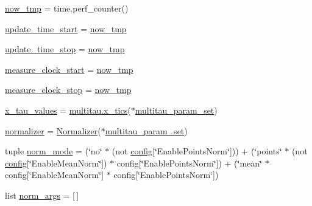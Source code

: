 \begin{DoxyCompactItemize}
\item 
\hyperlink{namespacephoton__statistics_a421423fcce411e182e41fde2e450d2d9}{now\+\_\+tmp} = time.\+perf\+\_\+counter()
\item 
\hyperlink{namespacephoton__statistics_a2c4e09ca6009ec89417e7fb1842dc290}{update\+\_\+time\+\_\+start} = \hyperlink{namespacephoton__statistics_a421423fcce411e182e41fde2e450d2d9}{now\+\_\+tmp}
\item 
\hyperlink{namespacephoton__statistics_a1353da1c17a4f960cbacf200dcf13d4f}{update\+\_\+time\+\_\+stop} = \hyperlink{namespacephoton__statistics_a421423fcce411e182e41fde2e450d2d9}{now\+\_\+tmp}
\item 
\hyperlink{namespacephoton__statistics_a5c7400e3258e9336ce831f0fbda24f33}{measure\+\_\+clock\+\_\+start} = \hyperlink{namespacephoton__statistics_a421423fcce411e182e41fde2e450d2d9}{now\+\_\+tmp}
\item 
\hyperlink{namespacephoton__statistics_a328243354a643086bd68145d804782d0}{measure\+\_\+clock\+\_\+stop} = \hyperlink{namespacephoton__statistics_a421423fcce411e182e41fde2e450d2d9}{now\+\_\+tmp}
\item 
\hyperlink{namespacephoton__statistics_a930bc99eb656180a9ae6318b16d77976}{x\+\_\+tau\+\_\+values} = \hyperlink{namespacemultitau_a775aea685fe55a6707400660fadf9c35}{multitau.\+x\+\_\+tics}($\ast$\hyperlink{namespacephoton__statistics_a3c57d728c4b1cdcb2b6ca63bc6adfc4d}{multitau\+\_\+param\+\_\+set})
\item 
\hyperlink{namespacephoton__statistics_a4476861cf199e5ef481ee4bc15e08847}{normalizer} = \hyperlink{classnormalizer_1_1Normalizer}{Normalizer}($\ast$\hyperlink{namespacephoton__statistics_a3c57d728c4b1cdcb2b6ca63bc6adfc4d}{multitau\+\_\+param\+\_\+set})
\item 
tuple \hyperlink{namespacephoton__statistics_a28a89caae4538b504046ed301158e677}{norm\+\_\+mode} = (\char`\"{}no\char`\"{} $\ast$ (not \hyperlink{namespacephoton__statistics_a4176c548148b1c86da6ddf320ab00e90}{config}\mbox{[}\char`\"{}Enable\+Points\+Norm\char`\"{}\mbox{]})) + (\char`\"{}points\char`\"{} $\ast$ (not \hyperlink{namespacephoton__statistics_a4176c548148b1c86da6ddf320ab00e90}{config}\mbox{[}\char`\"{}Enable\+Mean\+Norm\char`\"{}\mbox{]}) $\ast$ config\mbox{[}\char`\"{}Enable\+Points\+Norm\char`\"{}\mbox{]}) + (\char`\"{}mean\char`\"{} $\ast$ config\mbox{[}\char`\"{}Enable\+Mean\+Norm\char`\"{}\mbox{]} $\ast$ config\mbox{[}\char`\"{}Enable\+Points\+Norm\char`\"{}\mbox{]})
\item 
list \hyperlink{namespacephoton__statistics_af558fed5a93a7b134efea382f1ad4007}{norm\+\_\+args} = \mbox{[}$\,$\mbox{]}

\end{DoxyCompactItemize}
